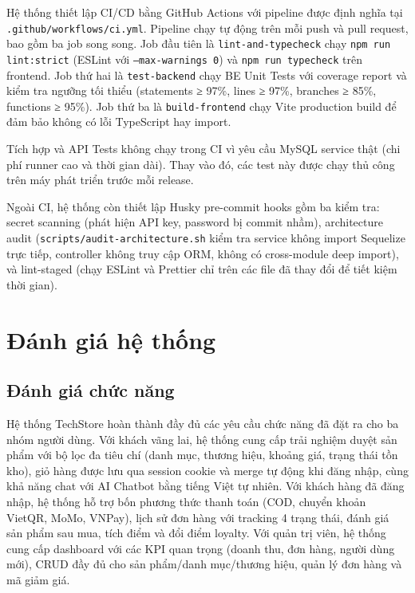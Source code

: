 Hệ thống thiết lập CI/CD bằng GitHub Actions với pipeline được định nghĩa tại \texttt{.github/workflows/ci.yml}. Pipeline chạy tự động trên mỗi push và pull request, bao gồm ba job song song. Job đầu tiên là \texttt{lint-and-typecheck} chạy \texttt{npm run lint:strict} (ESLint với \texttt{--max-warnings 0}) và \texttt{npm run typecheck} trên frontend. Job thứ hai là \texttt{test-backend} chạy BE Unit Tests với coverage report và kiểm tra ngưỡng tối thiểu (statements ≥ 97\%, lines ≥ 97\%, branches ≥ 85\%, functions ≥ 95\%). Job thứ ba là \texttt{build-frontend} chạy Vite production build để đảm bảo không có lỗi TypeScript hay import.

Tích hợp và API Tests không chạy trong CI vì yêu cầu MySQL service thật (chi phí runner cao và thời gian dài). Thay vào đó, các test này được chạy thủ công trên máy phát triển trước mỗi release.

Ngoài CI, hệ thống còn thiết lập Husky pre-commit hooks gồm ba kiểm tra: secret scanning (phát hiện API key, password bị commit nhầm), architecture audit (\texttt{scripts/audit-architecture.sh} kiểm tra service không import Sequelize trực tiếp, controller không truy cập ORM, không có cross-module deep import), và lint-staged (chạy ESLint và Prettier chỉ trên các file đã thay đổi để tiết kiệm thời gian).

\section{Đánh giá hệ thống}

\subsection{Đánh giá chức năng}

Hệ thống TechStore hoàn thành đầy đủ các yêu cầu chức năng đã đặt ra cho ba nhóm người dùng. Với khách vãng lai, hệ thống cung cấp trải nghiệm duyệt sản phẩm với bộ lọc đa tiêu chí (danh mục, thương hiệu, khoảng giá, trạng thái tồn kho), giỏ hàng được lưu qua session cookie và merge tự động khi đăng nhập, cùng khả năng chat với AI Chatbot bằng tiếng Việt tự nhiên. Với khách hàng đã đăng nhập, hệ thống hỗ trợ bốn phương thức thanh toán (COD, chuyển khoản VietQR, MoMo, VNPay), lịch sử đơn hàng với tracking 4 trạng thái, đánh giá sản phẩm sau mua, tích điểm và đổi điểm loyalty. Với quản trị viên, hệ thống cung cấp dashboard với các KPI quan trọng (doanh thu, đơn hàng, người dùng mới), CRUD đầy đủ cho sản phẩm/danh mục/thương hiệu, quản lý đơn hàng và mã giảm giá.

